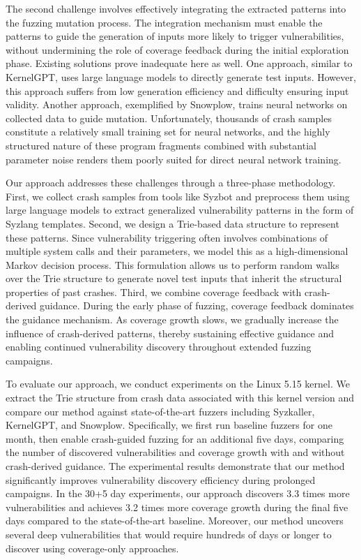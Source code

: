 The second challenge involves effectively integrating the extracted patterns into the fuzzing mutation process. The integration mechanism must enable the patterns to guide the generation of inputs more likely to trigger vulnerabilities, without undermining the role of coverage feedback during the initial exploration phase. Existing solutions prove inadequate here as well. One approach, similar to KernelGPT, uses large language models to directly generate test inputs. However, this approach suffers from low generation efficiency and difficulty ensuring input validity. Another approach, exemplified by Snowplow, trains neural networks on collected data to guide mutation. Unfortunately, thousands of crash samples constitute a relatively small training set for neural networks, and the highly structured nature of these program fragments combined with substantial parameter noise renders them poorly suited for direct neural network training.

Our approach addresses these challenges through a three-phase methodology. First, we collect crash samples from tools like Syzbot and preprocess them using large language models to extract generalized vulnerability patterns in the form of Syzlang templates. Second, we design a Trie-based data structure to represent these patterns. Since vulnerability triggering often involves combinations of multiple system calls and their parameters, we model this as a high-dimensional Markov decision process. This formulation allows us to perform random walks over the Trie structure to generate novel test inputs that inherit the structural properties of past crashes. Third, we combine coverage feedback with crash-derived guidance. During the early phase of fuzzing, coverage feedback dominates the guidance mechanism. As coverage growth slows, we gradually increase the influence of crash-derived patterns, thereby sustaining effective guidance and enabling continued vulnerability discovery throughout extended fuzzing campaigns.

To evaluate our approach, we conduct experiments on the Linux 5.15 kernel. We extract the Trie structure from crash data associated with this kernel version and compare our method against state-of-the-art fuzzers including Syzkaller, KernelGPT, and Snowplow. Specifically, we first run baseline fuzzers for one month, then enable crash-guided fuzzing for an additional five days, comparing the number of discovered vulnerabilities and coverage growth with and without crash-derived guidance. The experimental results demonstrate that our method significantly improves vulnerability discovery efficiency during prolonged campaigns. In the 30+5 day experiments, our approach discovers 3.3 times more vulnerabilities and achieves 3.2 times more coverage growth during the final five days compared to the state-of-the-art baseline. Moreover, our method uncovers several deep vulnerabilities that would require hundreds of days or longer to discover using coverage-only approaches.

